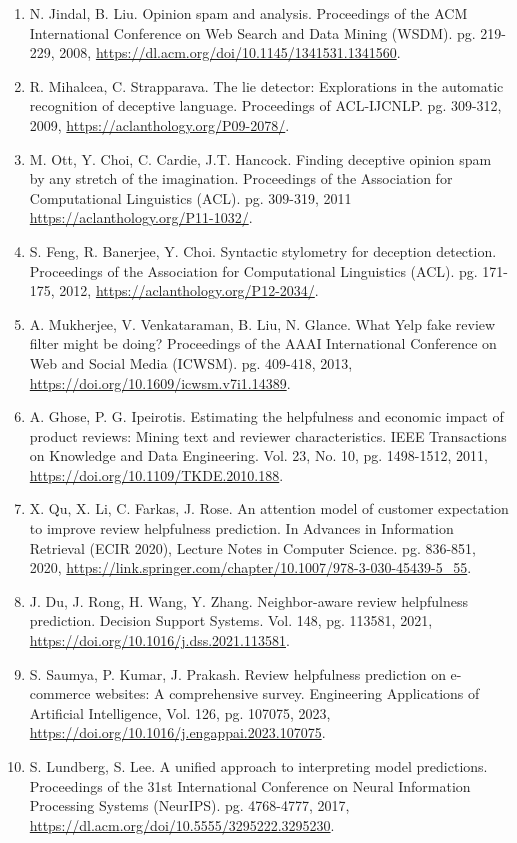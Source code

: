 \documentclass[12pt]{article}
\begin{document}
\begin{enumerate}

\item  N. Jindal, B. Liu. Opinion spam and analysis. Proceedings of the ACM International Conference on Web Search and Data Mining (WSDM). pg. 219-229, 2008,
\url{https://dl.acm.org/doi/10.1145/1341531.1341560}.

\item  R. Mihalcea, C. Strapparava. The lie detector: Explorations in the automatic recognition of deceptive language. Proceedings of ACL-IJCNLP. pg. 309-312, 2009,
\url{https://aclanthology.org/P09-2078/}.

\item M. Ott, Y. Choi, C. Cardie, J.T. Hancock. Finding deceptive opinion spam by any stretch of the imagination. Proceedings of the Association for Computational Linguistics (ACL). pg. 309-319, 2011
\url{https://aclanthology.org/P11-1032/}.

\item  S. Feng, R. Banerjee, Y. Choi. Syntactic stylometry for deception detection. Proceedings of the Association for Computational Linguistics (ACL). pg. 171-175, 2012, 
\url{https://aclanthology.org/P12-2034/}.

\item A. Mukherjee, V. Venkataraman, B. Liu, N. Glance. What Yelp fake review filter might be doing? Proceedings of the AAAI International Conference on Web and Social Media (ICWSM). pg. 409-418, 2013,   
\url{https://doi.org/10.1609/icwsm.v7i1.14389}.

\item A. Ghose, P. G. Ipeirotis. Estimating the helpfulness and economic impact of product reviews: Mining text and reviewer characteristics. IEEE Transactions on Knowledge and Data Engineering. Vol. 23, No. 10, pg. 1498-1512, 2011,   
\url{https://doi.org/10.1109/TKDE.2010.188}.

\item X. Qu, X. Li, C. Farkas, J. Rose. An attention model of customer expectation to improve review helpfulness prediction. In Advances in Information Retrieval (ECIR 2020), Lecture Notes in Computer Science. pg. 836-851, 2020,   
\url{https://link.springer.com/chapter/10.1007/978-3-030-45439-5_55}.

\item J. Du, J. Rong, H. Wang, Y. Zhang. Neighbor-aware review helpfulness prediction. Decision Support Systems. Vol. 148, pg. 113581, 2021,
\url{https://doi.org/10.1016/j.dss.2021.113581}.  
   
\item S. Saumya, P. Kumar, J. Prakash. Review helpfulness prediction on e-commerce websites: A comprehensive survey. Engineering Applications of Artificial Intelligence, Vol. 126, pg. 107075, 2023,   
\url{https://doi.org/10.1016/j.engappai.2023.107075}. 

\item S. Lundberg, S. Lee. A unified approach to interpreting model predictions. Proceedings of the 31st International Conference on Neural Information Processing Systems (NeurIPS). pg. 4768-4777, 2017,     
\url{https://dl.acm.org/doi/10.5555/3295222.3295230}.

\end{enumerate}
\end{document}
